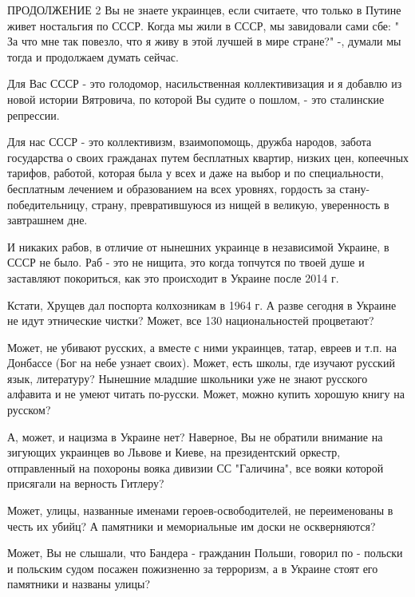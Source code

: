 \begin{itemize}
 
ПРОДОЛЖЕНИЕ 2 Вы не знаете украинцев, если считаете, что только в Путине живет
ностальгия по СССР. Когда мы жили в СССР, мы завидовали сами сбе: " За что мне
так повезло, что я живу в этой лучшей в мире стране?" -, думали мы тогда и
продолжаем думать сейчас. 

Для Вас СССР - это голодомор, насильственная коллективизация и я добавлю из
новой истории Вятровича, по которой Вы судите о пошлом, - это сталинские
репрессии. 

Для нас СССР - это коллективизм, взаимопомощь, дружба народов, забота
государства о своих гражданах путем бесплатных квартир, низких цен, копеечных
тарифов, работой, которая была у всех и даже на выбор и по специальности,
бесплатным лечением и образованием на всех уровнях, гордость за
стану-победительницу, страну, превратившуюся из нищей в великую, уверенность в
завтрашнем дне. 

И никаких рабов, в отличие от нынешних украинце в независимой Украине, в СССР
не было. Раб - это не нищита, это когда топчутся по твоей душе и заставляют
покориться, как это происходит в Украине после 2014 г. 

Кстати, Хрущев дал поспорта колхозникам в 1964 г. А разве сегодня в Украине не
идут этнические чистки? Может, все 130 национальностей процветают?

Может, не убивают русских, а вместе с ними украинцев, татар, евреев и т.п. на
Донбассе (Бог на небе узнает своих). Может, есть школы, где изучают русский
язык, литературу? Нынешние младшие школьники уже не знают русского алфавита и
не умеют читать по-русски. Может, можно купить хорошую книгу на русском? 

А, может, и нацизма в Украине нет? Наверное, Вы не обратили внимание на
зигующих украинцев во Львове и Киеве, на президентский оркестр, отправленный на
похороны вояка дивизии СС "Галичина", все вояки которой присягали на верность
Гитлеру?

Может, улицы, названные именами героев-освободителей, не переименованы в честь
их убийц? А памятники и мемориальные им доски не оскверняются? 

Может, Вы не слышали, что Бандера - гражданин Польши, говорил по - польски и
польским судом посажен пожизненно за терроризм, а в Украине стоят его памятники
и названы улицы? 


\end{itemize}
